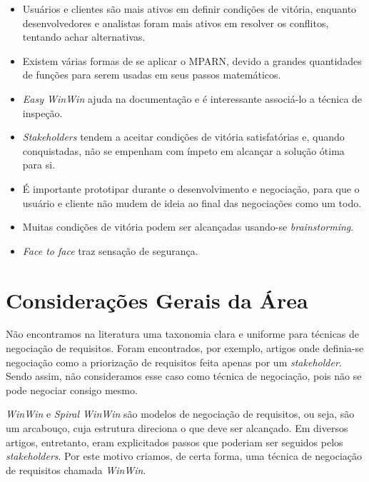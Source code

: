 \begin{itemize}
\setlength{\itemsep}{1pt}
\setlength{\itemindent}{20pt}
\item Usuários e clientes são mais ativos em definir condições de vitória,
enquanto desenvolvedores e analistas foram mais ativos em resolver os conflitos,
tentando achar alternativas. \cite{in2001applying}
\item Existem várias formas de se aplicar o MPARN, devido a grandes quantidades
de funções para serem usadas em seus passos matemáticos. \cite{in2002multi}
\item \textit{Easy WinWin} ajuda na documentação e é interessante associá-lo a
técnica de inspeção. \cite{khan2014integration}
\item \textit{Stakeholders} tendem a aceitar condições de vitória satisfatórias
e, quando conquistadas, não se empenham com ímpeto em alcançar a solução ótima para
si. \cite{in2001applying}
\item É importante prototipar durante o desenvolvimento e negociação, para que o
usuário e cliente não mudem de ideia ao final das negociações como um todo.
\cite{boehm1998using}
\item Muitas condições de vitória podem ser alcançadas usando-se
\textit{brainstorming}.
\cite{grunbacher2001surfacing}
\item \textit{Face to face} traz sensação de segurança. \cite{egyed1997analysis}
\end{itemize} 
 
\section{Considerações Gerais da Área}

Não encontramos na literatura uma taxonomia clara e uniforme para técnicas de
negociação de requisitos. Foram encontrados, por exemplo, artigos onde
definia-se negociação como a priorização de requisitos feita apenas por um
\textit{stakeholder}. Sendo assim, não consideramos esse caso como técnica de
negociação, pois não se pode negociar consigo mesmo.

\textit{WinWin} e \textit{Spiral WinWin} são modelos de negociação de
requisitos, ou seja, são um arcabouço, cuja estrutura direciona o que deve ser alcançado. Em diversos
artigos, entretanto, eram explicitados passos que poderiam ser seguidos pelos \textit{stakeholders}. Por este motivo criamos, de certa forma, uma técnica de negociação de
requisitos chamada \textit{WinWin}.


